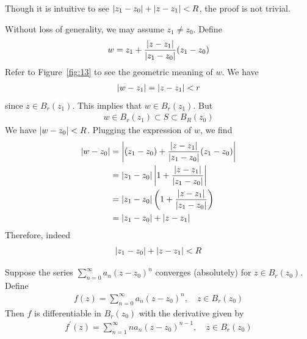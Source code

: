 \documentclass[thmcnt=section, 12pt]{my-elegantbook}
\begin{document}
Though it is intuitive to see $\left\lvert z_1 - z_0 \right\rvert + \left\lvert z - z_1 \right\rvert < R$, the proof is not trivial.

\begin{solution}
    Without loss of generality, we may assume $z_1 \neq z_0$. Define
    \begin{align*}
        w = z_1 + \frac{\left\lvert z - z_1 \right\rvert}{\left\lvert z_1 - z_0 \right\rvert} (z_1 - z_0)
    \end{align*}
    Refer to Figure~\ref{fig:13} to see the geometric meaning of $w$. We have
    \begin{align*}
        \left\lvert w - z_1 \right\rvert = \left\lvert z - z_1 \right\rvert < r
    \end{align*}
    since $z \in B_r(z_1)$. This implies that $w \in B_r(z_1)$. But
    \begin{align*}
        w \in B_r(z_1) \subset S \subset B_R(z_0)
    \end{align*}
    We have $\left\lvert w - z_0 \right\rvert < R$. Plugging the expression of $w$, we find
    \begin{align*}
        \left\lvert w - z_0 \right\rvert & = \left\lvert (z_1 - z_0) + \frac{\left\lvert z - z_1 \right\rvert}{\left\lvert z_1 - z_0 \right\rvert} (z_1 - z_0) \right\rvert \\
                      & = \left\lvert z_1 - z_0 \right\rvert \left\lvert 1 + \frac{\left\lvert z - z_1 \right\rvert}{\left\lvert z_1 - z_0 \right\rvert} \right\rvert       \\
                      & = \left\lvert z_1 - z_0 \right\rvert \left( 1 + \frac{\left\lvert z - z_1 \right\rvert}{\left\lvert z_1 - z_0 \right\rvert} \right)       \\
                      & = \left\lvert z_1 - z_0 \right\rvert + \left\lvert z - z_1 \right\rvert
    \end{align*}
    Therefore, indeed
    \begin{align*}
        \left\lvert z_1 - z_0 \right\rvert + \left\lvert z - z_1 \right\rvert < R
    \end{align*}
\end{solution}


\begin{theorem} \label{thm:64}
    Suppose the series $\sum_{n=0}^\infty a_n (z - z_0)^n$ converges (absolutely) for $z \in B_r(z_0)$. Define
    \begin{align*}
        f(z) = \sum_{n=0}^\infty a_n (z - z_0)^n,
        \quad z \in B_r(z_0)
    \end{align*}
    Then $f$ is differentiable in $B_r(z_0)$ with the derivative given by
    \begin{align}
        f^\prime(z)
        = \sum_{n=1}^\infty n a_n (z - z_0)^{n-1},
        \quad z \in B_r(z_0)
        \label{eq:130}
    \end{align}
\end{theorem}
\end{document}

